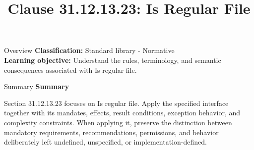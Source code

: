\documentclass[10pt,letterpaper]{article}
\title{Clause 31.12.13.23: Is Regular File}
\author{}
\date{}
\begin{document}
\maketitle
\begin{CornellOverviewBox}{Overview}
\textbf{Classification:} Standard library - Normative\\[2pt]
\textbf{Learning objective:} Understand the rules, terminology, and semantic consequences associated with Is regular file.
\end{CornellOverviewBox}\begin{CornellSummaryBox}{Summary}
{\sffamily\bfseries\color{Accent} Summary}\par\vspace{3pt}Section 31.12.13.23 focuses on Is regular file. Apply the specified interface together with its mandates, effects, result conditions, exception behavior, and complexity constraints. When applying it, preserve the distinction between mandatory requirements, recommendations, permissions, and behavior deliberately left undefined, unspecified, or implementation-defined.
\end{CornellSummaryBox}
\end{document}
